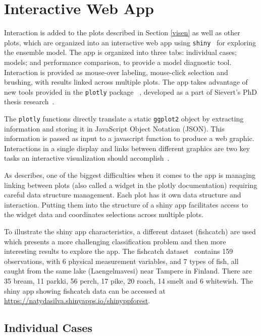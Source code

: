 \documentclass[smallextended,natbib]{svjour3}\usepackage[]{graphicx}\usepackage[]{xcolor}
\begin{document}
\section{Interactive Web App }\label{app}

 Interaction is added to the plots described in Section \ref{visen} as well as other plots, which are organized into an interactive web app using \verb#shiny#~\citep{chang11shiny, wickham2021mastering} for exploring the ensemble model. The app is organized into three tabs: individual cases; models; and performance comparison, to provide a model diagnostic tool. Interaction is provided as mouse-over labeling, mouse-click selection and brushing, with results linked across multiple plots. The app takes advantage of new tools provided in the \verb#plotly# package ~\citep{plotly,sievert2020interactive}, developed as a part of Sievert's PhD thesis research~\citep{sievertthesis}.

The \verb#plotly# functions directly translate a static \verb#ggplot2# object by extracting information and storing it in JavaScript Object Notation (JSON). This information is passed as input to a javascript function to produce a web graphic.  Interactions in a single display and links between different graphics are two key tasks an interactive visualization should accomplish~\citep{xie2014reactive}.

As \cite{sievert2020interactive} describes, one of the biggest difficulties when it comes to the app is managing linking between plots (also called a widget in the plotly documentation) requiring careful data structure management. Each plot has it own data structure and interaction. Putting them into the structure of a shiny app facilitates access to the widget data and coordinates selections across multiple plots.

To illustrate the shiny app characteristics, a different dataset (fishcatch) are used which presents a more challenging classification problem and then more interesting results to explore the app. The fishcatch dataset~\citep{fishcatch} contains 159 observations, with 6 physical measurement variables, and  7 types of fish, all caught from the same lake (Laengelmavesi) near Tampere in Finland. There are 35 bream, 11 parkki, 56 perch, 17 pike, 20 roach, 14 smelt and 6 whitewish. The shiny app showing fishcatch data can be accessed at \url{https://natydasilva.shinyapps.io/shinyppforest}.

\subsection{Individual Cases}
\end{document}
